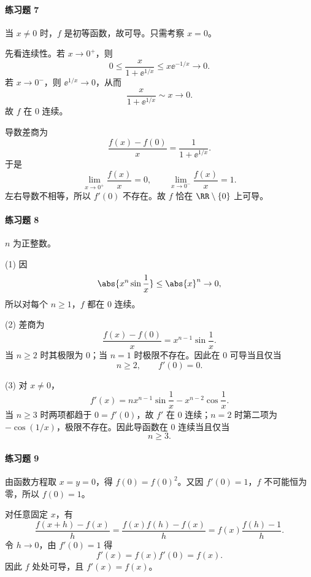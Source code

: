 \paragraph{练习题 7}
\begin{xsolution}
当 $x\ne0$ 时，$f$ 是初等函数，故可导。只需考察 $x=0$。

先看连续性。若 $x\to0^+$，则
\[
  0\le \frac{x}{1+\ee^{1/x}}\le x\ee^{-1/x}\to0.
\]
若 $x\to0^-$，则 $\ee^{1/x}\to0$，从而
\[
  \frac{x}{1+\ee^{1/x}}\sim x\to0.
\]
故 $f$ 在 $0$ 连续。

导数差商为
\[
  \frac{f(x)-f(0)}x=\frac1{1+\ee^{1/x}}.
\]
于是
\[
  \lim_{x\to0^+}\frac{f(x)}x=0,
  \qquad
  \lim_{x\to0^-}\frac{f(x)}x=1.
\]
左右导数不相等，所以 $f'(0)$ 不存在。故 $f$ 恰在 $\RR\setminus\{0\}$ 上可导。
\end{xsolution}

\paragraph{练习题 8}
\begin{xsolution}
$n$ 为正整数。

(1) 因
\[
  \abs{x^n\sin\frac1x}\le\abs{x}^n\to0,
\]
所以对每个 $n\ge1$，$f$ 都在 $0$ 连续。

(2) 差商为
\[
  \frac{f(x)-f(0)}x=x^{n-1}\sin\frac1x.
\]
当 $n\ge2$ 时其极限为 $0$；当 $n=1$ 时极限不存在。因此在 $0$ 可导当且仅当
\[
  \boxed{n\ge2},\qquad f'(0)=0.
\]

(3) 对 $x\ne0$，
\[
  f'(x)=n x^{n-1}\sin\frac1x-x^{n-2}\cos\frac1x.
\]
当 $n\ge3$ 时两项都趋于 $0=f'(0)$，故 $f'$ 在 $0$ 连续；$n=2$ 时第二项为 $-\cos(1/x)$，极限不存在。因此导函数在 $0$ 连续当且仅当
\[
  \boxed{n\ge3}.
\]
\end{xsolution}

\paragraph{练习题 9}
\begin{xsolution}
由函数方程取 $x=y=0$，得 $f(0)=f(0)^2$。又因 $f'(0)=1$，$f$ 不可能恒为零，所以 $f(0)=1$。

对任意固定 $x$，有
\[
  \frac{f(x+h)-f(x)}h
  =\frac{f(x)f(h)-f(x)}h
  =f(x)\frac{f(h)-1}h.
\]
令 $h\to0$，由 $f'(0)=1$ 得
\[
  f'(x)=f(x)f'(0)=f(x).
\]
因此 $f$ 处处可导，且 $f'(x)=f(x)$。
\end{xsolution}

